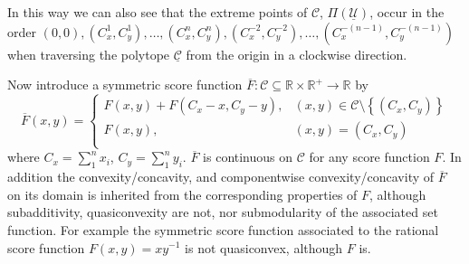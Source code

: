 \documentclass{article}
\theoremstyle{case}
\begin{document}
In this way we can also see that the extreme points of $\mathcal{C}$, $\Pi(\underline{\mathcal{U}})$, occur in the order $(0,0), (C_x^1, C_y^1), \dots, (C_x^n, C_y^n), (C_x^{-2}, C_y^{-2}), \dots, (C_x^{-(n-1)}, C_y^{-(n-1)})$ when traversing the polytope $\underline{\mathcal{C}}$ from the origin in a clockwise direction.

Now introduce a symmetric score function $\overline{F}\colon \mathcal{C} \subseteq \mathbb{R} \times \mathbb{R}^{+} \to \mathbb{R}$ by
\[   
\overline{F}\left( x,y\right) = \left\{
\begin{array}{ll}
      F\left( x,y\right) + F\left( C_x-x, C_y-y\right), & \left( x,y\right) \in \mathcal{C} \setminus{\left\lbrace \left( C_x, C_y\right) \right\rbrace}  \\
      F\left( x,y\right), & \left( x,y\right) = \left( C_x, C_y\right)  \\
\end{array} 
\right. 
\]
where $C_x = \sum_1^n x_i$, $C_y = \sum_1^n y_i$. $\overline{F}$ is continuous on $\mathcal{C}$ for any score function $F$. In addition the convexity/concavity, and componentwise convexity/concavity of $\overline{F}$ on its domain is inherited from the corresponding properties of $F$, although subadditivity, quasiconvexity are not, nor submodularity of the associated set function. For example the symmetric score function associated to the rational score function $F(x,y) = xy^{-1}$ is not quasiconvex, although $F$ is.

\end{document}
